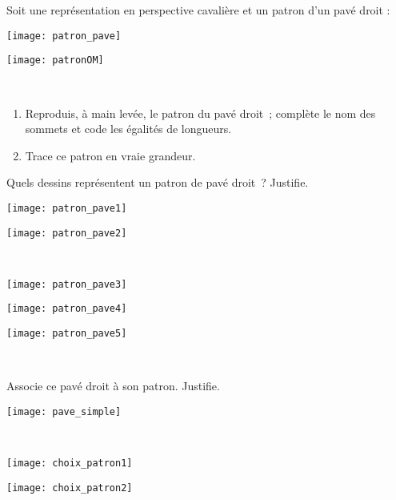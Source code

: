 \begin{exercice}
Soit une représentation en perspective cavalière et un patron d'un pavé droit :

\begin{minipage}[c]{0.48\linewidth}
 \texttt{[image: patron\_pave]}
 \end{minipage} \hfill%
 \begin{minipage}[c]{0.48\linewidth}
  \texttt{[image: patronOM]}
  \end{minipage} \\
\begin{enumerate}
 \item Reproduis, à main levée, le patron du pavé droit ; complète le nom des sommets et code les égalités de longueurs. 
 \item Trace ce patron en vraie grandeur.
 \end{enumerate}
\end{exercice}


\begin{exercice}
Quels dessins représentent un patron de pavé droit ? Justifie.

\begin{minipage}[c]{0.48\linewidth}
 \texttt{[image: patron\_pave1]}
 \end{minipage} \hfill%
 \begin{minipage}[c]{0.48\linewidth}
  \texttt{[image: patron\_pave2]}
  \end{minipage} \\
\begin{minipage}[c]{0.3\linewidth}
 \texttt{[image: patron\_pave3]}
 \end{minipage} \hfill%
 \begin{minipage}[c]{0.33\linewidth}
  \texttt{[image: patron\_pave4]}
 \end{minipage} \hfill%
 \begin{minipage}[c]{0.34\linewidth} 
  \texttt{[image: patron\_pave5]}  
  \end{minipage} \\
\end{exercice}


\begin{exercice}[Au choix]
\begin{minipage}[c]{0.68\linewidth}
Associe ce pavé droit à son patron. Justifie.
 \end{minipage} \hfill%
 \begin{minipage}[c]{0.30\linewidth}
  \texttt{[image: pave\_simple]}
  \end{minipage} \\
\begin{minipage}[c]{0.48\linewidth}
  \texttt{[image: choix\_patron1]}
 \end{minipage} \hfill%
 \begin{minipage}[c]{0.44\linewidth}
  \texttt{[image: choix\_patron2]}
  \end{minipage} \\
\end{exercice}


